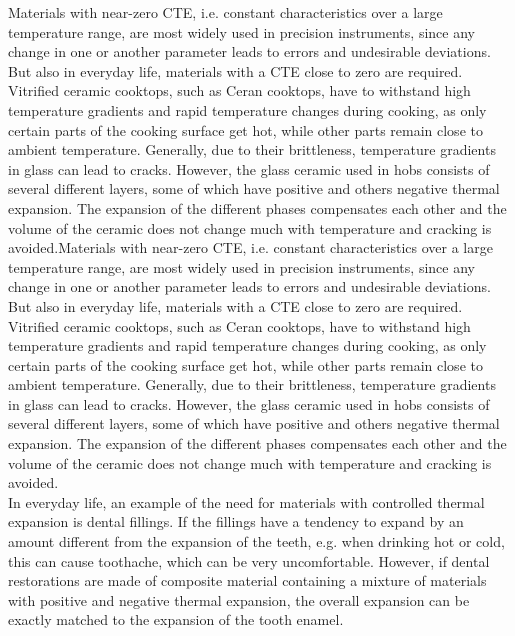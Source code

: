 \documentclass[10pt, a4paper, twocolumn]{article}
\begin{document}
Materials with near-zero CTE, i.e. constant characteristics over a large temperature range, are most widely used in precision instruments, since any change in one or another parameter leads to errors and undesirable deviations. But also in everyday life, materials with a CTE close to zero are required. Vitrified ceramic cooktops, such as Ceran cooktops, have to withstand high temperature gradients and rapid temperature changes during cooking, as only certain parts of the cooking surface get hot, while other parts remain close to ambient temperature. Generally, due to their brittleness, temperature gradients in glass can lead to cracks. However, the glass ceramic used in hobs consists of several different layers, some of which have positive and others negative thermal expansion. The expansion of the different phases compensates each other and the volume of the ceramic does not change much with temperature and cracking is avoided.Materials with near-zero CTE, i.e. constant characteristics over a large temperature range, are most widely used in precision instruments, since any change in one or another parameter leads to errors and undesirable deviations. But also in everyday life, materials with a CTE close to zero are required. Vitrified ceramic cooktops, such as Ceran cooktops, have to withstand high temperature gradients and rapid temperature changes during cooking, as only certain parts of the cooking surface get hot, while other parts remain close to ambient temperature. Generally, due to their brittleness, temperature gradients in glass can lead to cracks. However, the glass ceramic used in hobs consists of several different layers, some of which have positive and others negative thermal expansion. The expansion of the different phases compensates each other and the volume of the ceramic does not change much with temperature and cracking is avoided.\\ 

In everyday life, an example of the need for materials with controlled thermal expansion is dental fillings. If the fillings have a tendency to expand by an amount different from the expansion of the teeth, e.g. when drinking hot or cold, this can cause toothache, which can be very uncomfortable. However, if dental restorations are made of composite material containing a mixture of materials with positive and negative thermal expansion, the overall expansion can be exactly matched to the expansion of the tooth enamel.

\end{document}
